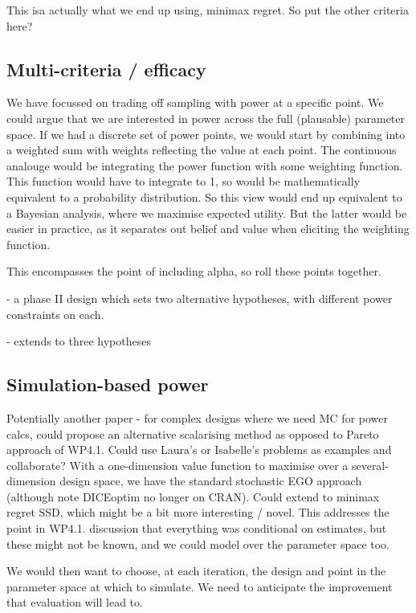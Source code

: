 \documentclass[sagev, Crown]{sagej}
\begin{document}
This isa actually what we end up using, minimax regret. So put the other criteria here?

\subsection{Multi-criteria / efficacy}

We have focussed on trading off sampling with power at a specific point. We could argue that we are interested in power across the full (plausable) parameter space. If we had a discrete set of power points, we would start by combining into a weighted sum with weights reflecting the value at each point. The continuous analouge would be integrating the power function with some weighting function. This function would have to integrate to 1, so would be mathematically equivalent to a probability distribution. So this view would end up equivalent to a Bayesian analysis, where we maximise expected utility. But the latter would be easier in practice, as it separates out belief and value when eliciting the weighting function.

This encompasses the point of including alpha, so roll these points together.

\cite{Lin2004} - a phase II design which sets two alternative hypotheses, with different power constraints on each.

\cite{Kim2017} - extends to three hypotheses

\subsection{Simulation-based power}

Potentially another paper - for complex designs where we need MC for power calcs, could propose an alternative scalarising method as opposed to Pareto approach of WP4.1. Could use Laura's or Isabelle's problems as examples and collaborate? With a one-dimension value function to maximise over a several-dimension design space, we have the standard stochastic EGO approach (although note DICEoptim no longer on CRAN). Could extend to minimax regret SSD, which might be a bit more interesting / novel. This addresses the point in WP4.1. discussion that everything was conditional on estimates, but these might not be known, and we could model over the parameter space too. 

We would then want to choose, at each iteration, the design and point in the parameter space at which to simulate. We need to anticipate the improvement that evaluation will lead to. 
\end{document}
